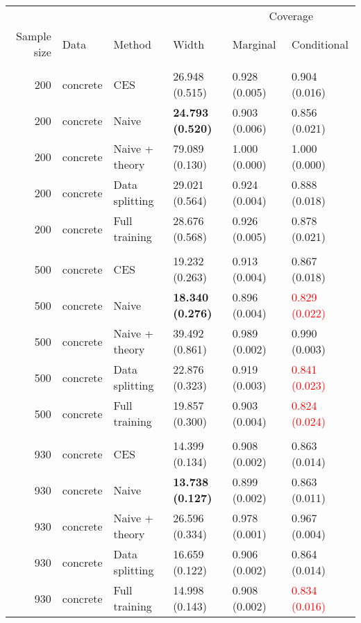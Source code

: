 \begin{tabular}[t]{rlllll}
\toprule
\multicolumn{4}{c}{ } & \multicolumn{2}{c}{Coverage} \\
\cmidrule(l{3pt}r{3pt}){5-6}
Sample size & Data & Method & Width & Marginal & Conditional\\
\midrule
\addlinespace[0.3em]
\multicolumn{6}{l}{\textbf{200}}\\
\hspace{1em}200 & concrete & CES & 26.948 (0.515) & 0.928 (0.005) & 0.904 (0.016)\\
\hspace{1em}200 & concrete & Naive & \textbf{24.793 (0.520)} & 0.903 (0.006) & 0.856 (0.021)\\
\hspace{1em}200 & concrete & Naive + theory & 79.089 (0.130) & 1.000 (0.000) & 1.000 (0.000)\\
\hspace{1em}200 & concrete & Data splitting & 29.021 (0.564) & 0.924 (0.004) & 0.888 (0.018)\\
\hspace{1em}200 & concrete & Full training & 28.676 (0.568) & 0.926 (0.005) & 0.878 (0.021)\\
\addlinespace[0.3em]
\multicolumn{6}{l}{\textbf{500}}\\
\hspace{1em}500 & concrete & CES & 19.232 (0.263) & 0.913 (0.004) & 0.867 (0.018)\\
\hspace{1em}500 & concrete & Naive & \textbf{18.340 (0.276)} & 0.896 (0.004) & \textcolor{red}{0.829 (0.022)}\\
\hspace{1em}500 & concrete & Naive + theory & 39.492 (0.861) & 0.989 (0.002) & 0.990 (0.003)\\
\hspace{1em}500 & concrete & Data splitting & 22.876 (0.323) & 0.919 (0.003) & \textcolor{red}{0.841 (0.023)}\\
\hspace{1em}500 & concrete & Full training & 19.857 (0.300) & 0.903 (0.004) & \textcolor{red}{0.824 (0.024)}\\
\addlinespace[0.3em]
\multicolumn{6}{l}{\textbf{930}}\\
\hspace{1em}930 & concrete & CES & 14.399 (0.134) & 0.908 (0.002) & 0.863 (0.014)\\
\hspace{1em}930 & concrete & Naive & \textbf{13.738 (0.127)} & 0.899 (0.002) & 0.863 (0.011)\\
\hspace{1em}930 & concrete & Naive + theory & 26.596 (0.334) & 0.978 (0.001) & 0.967 (0.004)\\
\hspace{1em}930 & concrete & Data splitting & 16.659 (0.122) & 0.906 (0.002) & 0.864 (0.014)\\
\hspace{1em}930 & concrete & Full training & 14.998 (0.143) & 0.908 (0.002) & \textcolor{red}{0.834 (0.016)}\\
\bottomrule
\end{tabular}
